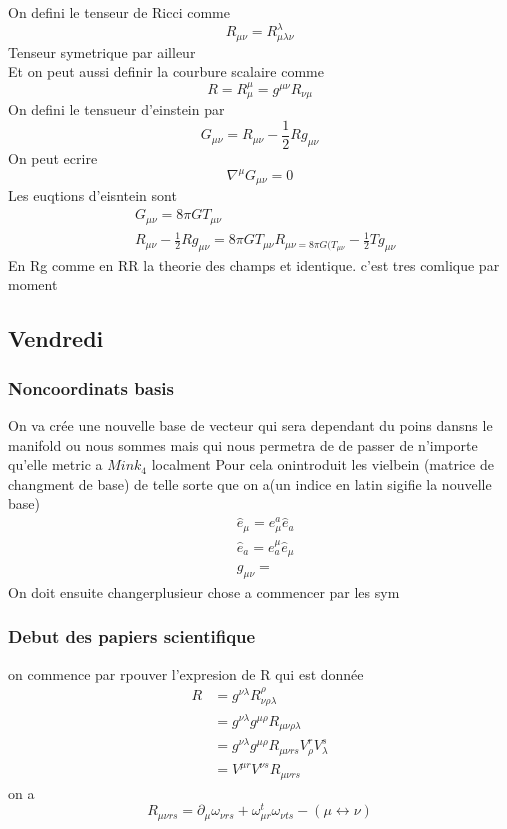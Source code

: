 \documentclass{article}
\begin{document}
On defini le tenseur de Ricci comme 
\begin{equation}
    R_{\mu \nu} =R^{\lambda}_{\mu \lambda\nu}
\end{equation}
Tenseur symetrique par ailleur\\
Et on peut aussi definir la courbure scalaire comme
\begin{equation}
    R = R^{\mu}_{\mu}= g^{\mu \nu}R_{\nu \mu}
\end{equation}
On defini le tensueur d'einstein par
\begin{equation}
    G_{ \mu \nu} = R_{\mu \nu} -\frac{1}{2}Rg_{\mu \nu}
\end{equation}
On peut ecrire
\begin{equation}
    \nabla^{\mu}G_{ \mu \nu} =0
\end{equation}
Les euqtions d'eisntein sont  
\begin{align}
    &G_{\mu \nu} = 8 \pi G T_{\mu \nu} \\
    &R_{\mu \nu} -\frac{1}{2}Rg_{\mu \nu} = 8 \pi G T_{\mu \nu}
    R_{\mu \nu =8 \pi G (T_{\mu \nu}}-\frac{1}{2}Tg_{\mu \nu}
\end{align}
En Rg comme en RR la theorie des champs et identique. c'est tres comlique par moment
\subsection{Vendredi}
\subsubsection{Noncoordinats basis}
On va crée une nouvelle base de vecteur qui sera dependant du poins dansns le manifold ou nous sommes mais
qui nous permetra de  de passer de n'importe qu'elle metric a $Mink_4$ localment
Pour cela onintroduit les vielbein (matrice de changment de base) de telle sorte que on a(un indice en latin sigifie la nouvelle base)
\begin{align}
    &\hat{e}_{\mu} = e_{\mu}^{a}\hat{e}_a\\
    &\hat{e}_{a} = e_{a}^{\mu}\hat{e}_{\mu}\\
    & g_{\mu \nu} = 
\end{align}
On doit ensuite changerplusieur chose a commencer par les sym
\subsubsection{Debut des papiers scientifique}
on commence par rpouver l'expresion de R qui est donnée
\begin{align}
    R&=g^{\nu \lambda}R^{\rho}_{\nu \rho \lambda}\\
    &=g^{\nu \lambda}g^{\mu \rho}R_{\mu \nu \rho \lambda}\\
    &=g^{\nu \lambda}g^{\mu \rho}R_{\mu \nu r s}V^{r}_{\rho}V^{s}_{\lambda}\\
    &=V^{\mu r}V^{\nu s}R_{\mu \nu r s}
\end{align}
on a
\begin{equation}
    R_{\mu \nu r s} = \partial_{\mu}\omega_{\nu r s} + \omega_{\mu r}^{t}\omega_{\nu t s} - (\mu \leftrightarrow \nu)
\end{equation}
\end{document}
